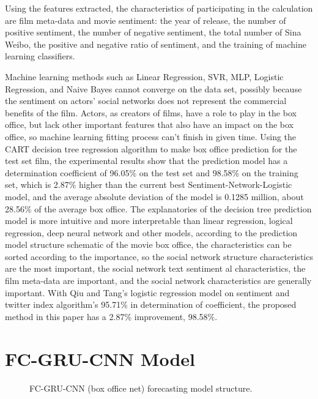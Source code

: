 \documentclass[review]{cvpr}
\begin{document}
Using the features extracted, the characteristics of participating in the calculation are film meta-data and movie sentiment: the year of release, the number of positive sentiment, the number of negative sentiment, the total number of Sina Weibo, the positive and negative ratio of sentiment, and the training of machine learning classifiers.

Machine learning methods such as Linear Regression, SVR, MLP, Logistic Regression, and Naive Bayes cannot converge on the data set, possibly because the sentiment on actors' social networks does not represent the commercial benefits of the film.
Actors, as creators of films, have a role to play in the box office, but lack other important features that also have an impact on the box office, so machine learning fitting process can't finish in given time.
Using the CART decision tree regression algorithm to make box office prediction for the test set film, 
the experimental results show that the prediction model has a determination coefficient of 96.05\% on the test set and 98.58\% on the training set, which is 2.87\% higher than the current best Sentiment-Network-Logistic model, 
and the average absolute deviation of the model is 0.1285 million, about 28.56\% of the average box office.
The explanatories of the decision tree prediction model is more intuitive and more interpretable than linear regression, logical regression, deep neural network and other models, according to the prediction model structure schematic of the movie box office, 
the characteristics can be sorted according to the importance, so the social network structure characteristics are the most important, the social network text sentiment al characteristics, the film meta-data are important, and the social network characteristics are generally important.
With Qiu and Tang's logistic regression model on sentiment and twitter index algorithm's 95.71\% in determination of coefficient, the proposed method in this paper has a 2.87\% improvement, 98.58\%.

\section{FC-GRU-CNN Model}


\begin{figure*}
\begin{center}
\end{center}
   \caption{FC-GRU-CNN (box office net) forecasting model structure.}
\label{fig:short}
\end{figure*}
\end{document}
